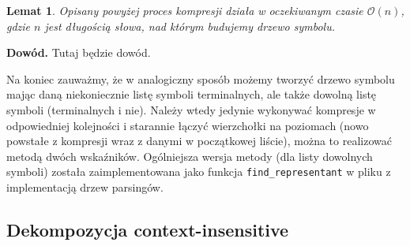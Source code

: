 \documentclass[declaration,shortabstract]{iithesis}
\theoremstyle{definition} \newtheorem{definition}{Definicja}[chapter]
\theoremstyle{remark} \newtheorem{remark}[definition]{Obserwacja}
\theoremstyle{plain} \newtheorem{theorem}[definition]{Twierdzenie}
\theoremstyle{remark} \newtheorem{example}{Przykład}[definition]
\theoremstyle{plain} \newtheorem{lemma}[definition]{Lemat}
\begin{document}
\begin{lemma}
    Opisany powyżej proces kompresji działa w oczekiwanym czasie $\mathcal{O}(n)$, gdzie $n$ jest długością słowa, nad którym budujemy drzewo symbolu.
\end{lemma}

\noindent
\textbf{Dowód.} Tutaj będzie dowód.

Na koniec zauważmy, że w analogiczny sposób możemy tworzyć drzewo symbolu mając daną niekoniecznie listę symboli terminalnych, ale także dowolną listę symboli (terminalnych i nie). Należy wtedy jedynie wykonywać kompresje w odpowiedniej kolejności i starannie łączyć wierzchołki na poziomach (nowo powstałe z kompresji wraz z danymi w początkowej liście), można to realizować metodą dwóch wskaźników. Ogólniejsza wersja metody (dla listy dowolnych symboli) została zaimplementowana jako funkcja \texttt{find\_representant} w pliku z implementacją drzew parsingów.

\subsection{Dekompozycja context-insensitive}
\end{document}
